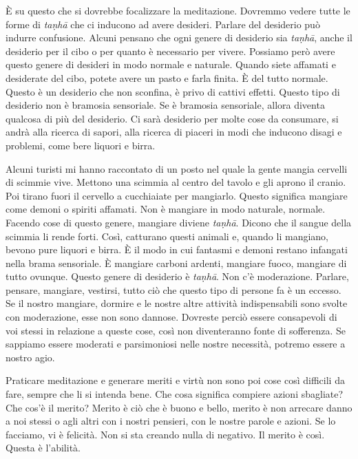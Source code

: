 È su questo che si dovrebbe focalizzare la meditazione. Dovremmo vedere
tutte le forme di \emph{taṇhā} che ci inducono ad avere desideri.
Parlare del desiderio può indurre confusione. Alcuni pensano che ogni
genere di desiderio sia \emph{taṇhā}, anche il desiderio per il cibo o
per quanto è necessario per vivere. Possiamo però avere questo genere di
desideri in modo normale e naturale. Quando siete affamati e desiderate
del cibo, potete avere un pasto e farla finita. È del tutto normale.
Questo è un desiderio che non sconfina, è privo di cattivi effetti.
Questo tipo di desiderio non è bramosia sensoriale. Se è bramosia
sensoriale, allora diventa qualcosa di più del desiderio. Ci sarà
desiderio per molte cose da consumare, si andrà alla ricerca di sapori,
alla ricerca di piaceri in modi che inducono disagi e problemi, come
bere liquori e birra.

Alcuni turisti mi hanno raccontato di un posto nel quale la gente mangia
cervelli di scimmie vive. Mettono una scimmia al centro del tavolo e gli
aprono il cranio. Poi tirano fuori il cervello a cucchiaiate per
mangiarlo. Questo significa mangiare come demoni o spiriti affamati. Non
è mangiare in modo naturale, normale. Facendo cose di questo genere,
mangiare diviene \emph{taṇhā}. Dicono che il sangue della scimmia li
rende forti. Così, catturano questi animali e, quando li mangiano,
bevono pure liquori e birra. È il modo in cui fantasmi e demoni restano
infangati nella brama sensoriale. È mangiare carboni ardenti, mangiare
fuoco, mangiare di tutto ovunque. Questo genere di desiderio è
\emph{taṇhā}. Non c'è moderazione. Parlare, pensare, mangiare, vestirsi,
tutto ciò che questo tipo di persone fa è un eccesso. Se il nostro
mangiare, dormire e le nostre altre attività indispensabili sono svolte
con moderazione, esse non sono dannose. Dovreste perciò essere
consapevoli di voi stessi in relazione a queste cose, così non
diventeranno fonte di sofferenza. Se sappiamo essere moderati e
parsimoniosi nelle nostre necessità, potremo essere a nostro agio.

Praticare meditazione e generare meriti e virtù non sono poi cose così
difficili da fare, sempre che li si intenda bene. Che cosa significa
compiere azioni sbagliate? Che cos'è il merito? Merito è ciò che è buono
e bello, merito è non arrecare danno a noi stessi o agli altri con i
nostri pensieri, con le nostre parole e azioni. Se lo facciamo, vi è
felicità. Non si sta creando nulla di negativo. Il merito è così. Questa
è l'abilità.

